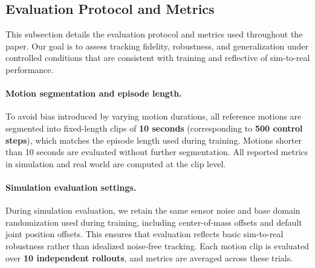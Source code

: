 





 

\subsection{Evaluation Protocol and Metrics}
\label{sec:supp_eval}

This subsection details the evaluation protocol and metrics used throughout the paper.
Our goal is to assess tracking fidelity, robustness, and generalization under controlled
conditions that are consistent with training and reflective of sim-to-real performance.

\paragraph{Motion segmentation and episode length.}
To avoid bias introduced by varying motion durations, all reference motions are segmented
into fixed-length clips of \textbf{10 seconds} (corresponding to \textbf{500 control steps}),
which matches the episode length used during training.
Motions shorter than 10 seconds are evaluated without further segmentation.
All reported metrics in simulation and real world are computed at the clip level.

\paragraph{Simulation evaluation settings.}
During simulation evaluation, we retain the same sensor noise and base domain randomization
used during training, including center-of-mass offsets and default joint position offsets.
This ensures that evaluation reflects basic sim-to-real robustness rather than idealized
noise-free tracking.
Each motion clip is evaluated over \textbf{10 independent rollouts}, and metrics are averaged
across these trials.

